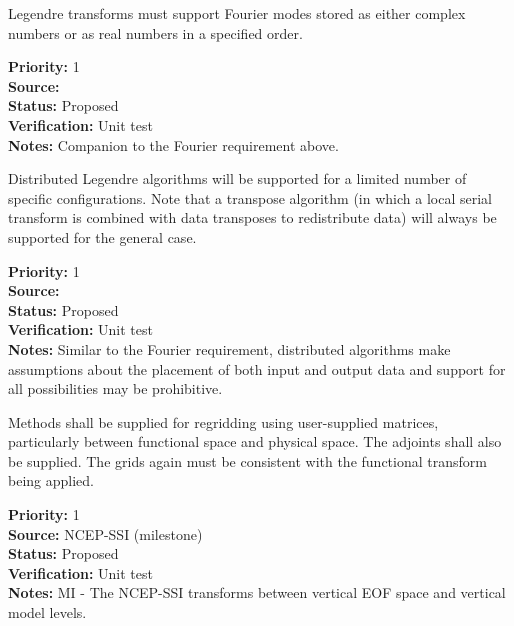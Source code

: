 Legendre transforms must support Fourier modes stored as either
complex numbers or as real numbers in a specified order.

\begin{reqlist}
{\bf Priority:} 1 \\
{\bf Source:}  \\
{\bf Status:} Proposed \\
{\bf Verification:} Unit test \\
{\bf Notes:}  Companion to the Fourier requirement above.
\end{reqlist}


Distributed Legendre algorithms will be supported for a limited
number of specific configurations.  Note that a transpose
algorithm (in which a local serial transform is combined
with data transposes to redistribute data) will always
be supported for the general case.

\begin{reqlist}
{\bf Priority:} 1 \\
{\bf Source:}  \\
{\bf Status:} Proposed \\
{\bf Verification:} Unit test \\
{\bf Notes:} Similar to the Fourier requirement,
             distributed algorithms make assumptions about
             the placement of both input and output data and
             support for all possibilities may be prohibitive.
\end{reqlist}


Methods shall be supplied for regridding using user-supplied matrices,
particularly between functional space and physical space.
The adjoints shall also be supplied.  The grids again must be consistent
with the functional transform being applied.

\begin{reqlist}
{\bf Priority:} 1 \\
{\bf Source:}  NCEP-SSI (milestone) \\
{\bf Status:} Proposed \\
{\bf Verification:} Unit test \\
{\bf Notes:} MI - The NCEP-SSI transforms between vertical EOF space
             and vertical model levels.
\end{reqlist}

